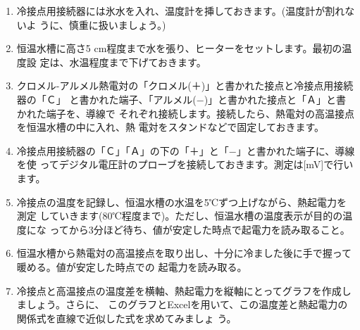 \begin{enumerate}

\item 冷接点用接続器には氷水を入れ、温度計を挿しておきます。(温度計が割れないよ 
うに、慎重に扱いましょう。)

\item 恒温水槽に高さ5 cm程度まで水を張り、ヒーターをセットします。最初の温度設
定は、水温程度まで下げておきます。

\item クロメル-アルメル熱電対の「クロメル(＋)」と書かれた接点と冷接点用接続器の「Ｃ」 
と書かれた端子、「アルメル(−)」と書かれた接点と「Ａ」と書かれた端子を、導線で 
それぞれ接続します。接続したら、熱電対の高温接点を恒温水槽の中に入れ、熱 
電対をスタンドなどで固定しておきます。

\item 冷接点用接続器の「Ｃ」「Ａ」の下の「＋」と「−」と書かれた端子に、導線を使 
ってデジタル電圧計のプローブを接続しておきます。測定は[mV]で行います。

\item 冷接点の温度を記録し、恒温水槽の水温を5℃ずつ上げながら、熱起電力を測定 
していきます(80℃程度まで)。ただし、恒温水槽の温度表示が目的の温度にな 
ってから3分ほど待ち、値が安定した時点で起電力を読み取ること。

\item 恒温水槽から熱電対の高温接点を取り出し、十分に冷ました後に手で握って暖める。値が安定した時点での
起電力を読み取る。

\item 冷接点と高温接点の温度差を横軸、熱起電力を縦軸にとってグラフを作成しましょう。さらに、
このグラフとExcelを用いて、この温度差と熱起電力の関係式を直線で近似した式を求めてみましょ
う。

\end{enumerate}



